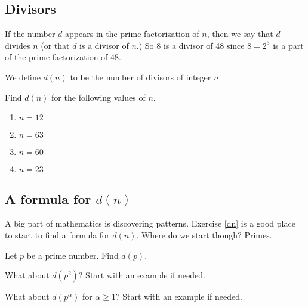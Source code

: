 \subsection{Divisors}
If the number $d$ appears in the prime factorization of $n$, then we say that $d$ divides $n$ (or that $d$ is a divisor of $n$.) So 8 is a divisor of 48 since $8 = 2^3$ is a part of the prime factorization of 48.

\noindent We define $d(n)$ to be the number of divisors of integer $n$.

\begin{exercise}\label{dn}
Find $d(n)$ for the following values of $n$.
\end{exercise}

\begin{enumerate}
    \item $n = 12$
    
    \vspace{1in}
    
    \item $n = 63$
    
    \vspace{1in} 
    
    \item $n = 60$
    
    \vspace{1in}
    
    \item $n = 23$
    
\end{enumerate}

\subsection{A formula for $d(n)$}
A big part of mathematics is discovering patterns. Exercise \ref{dn} is a good place to start to find a formula for $d(n)$. Where do we start though? Primes.

\begin{exercise}
Let $p$ be a prime number. Find $d(p)$.
\end{exercise}

\newpage

\begin{exercise}
What about $d(p^2)$? Start with an example if needed.
\end{exercise}

\vspace{2in}

\begin{exercise}
What about $d(p^{\alpha})$ for $\alpha \geq 1$? Start with an example if needed.
\end{exercise}

